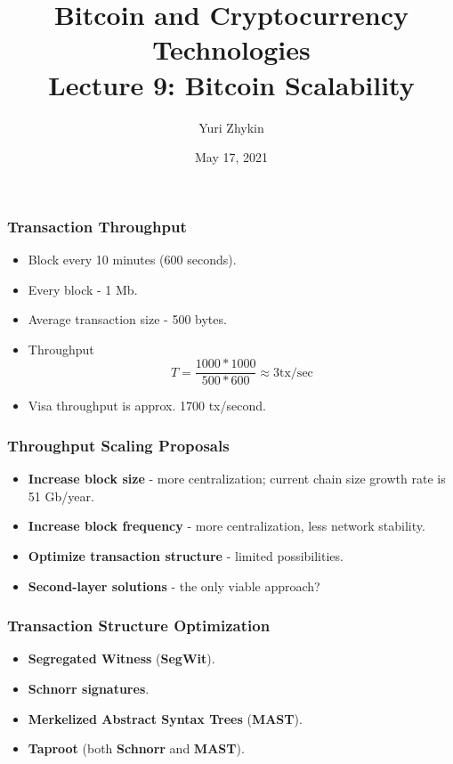 \documentclass{beamer}
\title{
  Bitcoin and Cryptocurrency Technologies \\
  Lecture 9: Bitcoin Scalability
}
\author{Yuri Zhykin}
\date{May 17, 2021}
\begin{document}
\frame{\titlepage}

\begin{frame}
  \frametitle{Transaction Throughput}
  \begin{itemize}
  \item Block every 10 minutes (600 seconds).
  \item Every block - 1 Mb.
  \item Average transaction size - 500 bytes.
  \item Throughput
    $$T = \frac{1000 * 1000}{500 * 600} \approx 3 \text{tx/sec}$$
  \item Visa throughput is approx. 1700 tx/second.
  \end{itemize}
\end{frame}

\begin{frame}
  \frametitle{Throughput Scaling Proposals}
  \begin{itemize}
  \item \textbf{Increase block size} - more centralization; current chain size
    growth rate is 51 Gb/year.
  \item \textbf{Increase block frequency} - more centralization, less network
    stability.
  \item \textbf{Optimize transaction structure} - limited possibilities.
  \item \textbf{Second-layer solutions} - the only viable approach?
  \end{itemize}
\end{frame}

\begin{frame}
  \frametitle{Transaction Structure Optimization}
  \begin{itemize}
  \item \textbf{Segregated Witness} (\textbf{SegWit}).
  \item \textbf{Schnorr signatures}.
  \item \textbf{Merkelized Abstract Syntax Trees} (\textbf{MAST}).
  \item \textbf{Taproot} (both \textbf{Schnorr} and \textbf{MAST}).
  \end{itemize}
\end{frame}
\end{document}
